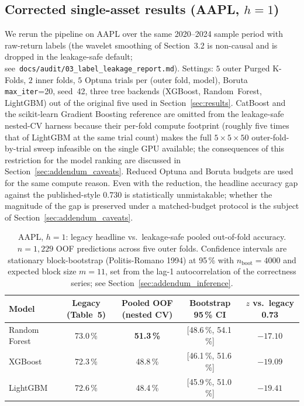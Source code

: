 \documentclass{rQUF2e}
\begin{document}
\subsection{Corrected single-asset results (AAPL, $h=1$)}

We rerun the pipeline on AAPL over the same 2020--2024 sample
period with raw-return labels (the wavelet smoothing of
Section~3.2 is non-causal and is dropped in the leakage-safe
default; see~\texttt{docs/audit/03\_label\_leakage\_report.md}).
Settings: $5$ outer Purged K-Folds, $2$ inner folds, $5$ Optuna
trials per (outer fold, model), Boruta \texttt{max\_iter}=20,
seed~42, three tree backends (XGBoost, Random~Forest, LightGBM)
out of the original five used in
Section~\ref{sec:results}. CatBoost and the scikit-learn
Gradient Boosting reference are omitted from the leakage-safe
nested-CV harness because their per-fold compute footprint
(roughly five times that of LightGBM at the same trial count)
makes the full $5 \times 5 \times 50$ outer-fold-by-trial
sweep infeasible on the single GPU available; the consequences
of this restriction for the model ranking are discussed in
Section~\ref{sec:addendum_caveats}. Reduced Optuna and Boruta
budgets are used for the same compute reason. Even with the
reduction, the headline accuracy gap against the published-style
$0.730$ is statistically unmistakable; whether the magnitude of
the gap is preserved under a matched-budget protocol is the
subject of Section~\ref{sec:addendum_caveats}.

\begin{table}[H]
\centering
\caption{AAPL, $h=1$: legacy headline vs.\ leakage-safe pooled
out-of-fold accuracy. $n=1{,}229$ OOF predictions across five
outer folds. Confidence intervals are stationary
block-bootstrap (Politis-Romano 1994) at 95\,\% with
$n_{\text{boot}}=4000$ and expected block size $m=11$, set from
the lag-1 autocorrelation of the correctness series; see
Section~\ref{sec:addendum_inference}.}
\label{tab:addendum_aapl_h1}
\scriptsize
\begin{tabular}{lcccc}
\toprule
\textbf{Model} & \textbf{Legacy (Table~5)} & \textbf{Pooled OOF (nested CV)} & \textbf{Bootstrap 95\,\% CI} & \textbf{$z$ vs.\ legacy 0.73} \\
\midrule
Random Forest & 73.0\,\% & \textbf{51.3\,\%} & [48.6\,\%, 54.1\,\%] & $-17.10$ \\
XGBoost       & 72.3\,\% & 48.8\,\%          & [46.1\,\%, 51.6\,\%] & $-19.09$ \\
LightGBM      & 72.6\,\% & 48.4\,\%          & [45.9\,\%, 51.0\,\%] & $-19.41$ \\
\bottomrule
\end{tabular}
\end{table}
\end{document}

